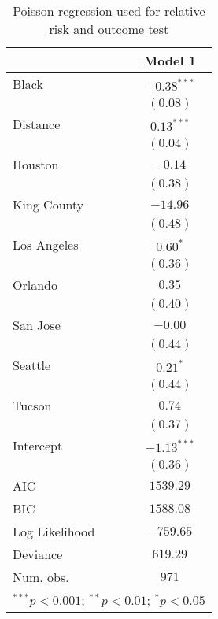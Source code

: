 
\begin{table}[ht!]
\begin{center}
\begin{tabular}{l c}
\toprule
 & Model 1 \\
\midrule
Black          & $-0.38^{***}$ \\
               & $(0.08)$      \\
Distance       & $0.13^{***}$  \\
               & $(0.04)$      \\
Houston        & $-0.14$       \\
               & $(0.38)$      \\
King County    & $-14.96$      \\
               & $(0.48)$      \\
Los Angeles    & $0.60^{*}$    \\
               & $(0.36)$      \\
Orlando        & $0.35$        \\
               & $(0.40)$      \\
San Jose       & $-0.00$       \\
               & $(0.44)$      \\
Seattle        & $0.21^{*}$    \\
               & $(0.44)$      \\
Tucson         & $0.74$        \\
               & $(0.37)$      \\
Intercept      & $-1.13^{***}$ \\
               & $(0.36)$      \\
\midrule
AIC            & $1539.29$     \\
BIC            & $1588.08$     \\
Log Likelihood & $-759.65$     \\
Deviance       & $619.29$      \\
Num. obs.      & $971$         \\
\bottomrule
\multicolumn{2}{l}{\scriptsize{$^{***}p<0.001$; $^{**}p<0.01$; $^{*}p<0.05$}}
\end{tabular}
\caption{Poisson regression used for relative risk and outcome test}
\label{tab:poissonRR2}
\end{center}
\end{table}
